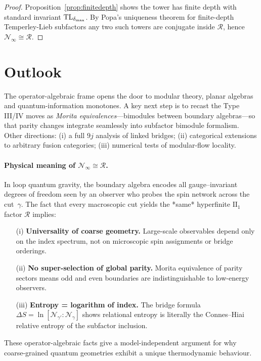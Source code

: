 \documentclass[11pt]{article}
\begin{document}
\begin{proof}
Proposition~\ref{prop:finitedepth} shows the tower has finite depth with
standard invariant ${\rm TL}_{\delta_{\max}}$.
By Popa's uniqueness theorem for finite-depth Temperley-Lieb
subfactors \cite{PopaCBMS} any two such towers are conjugate inside
$\mathcal R$, hence $\mathcal N_{\infty}\cong\mathcal R$.
\end{proof}

\section{Outlook}
The operator-algebraic frame opens the door to modular theory, planar
algebras and quantum-information monotones.  A key next step is to recast the
Type III/IV moves as \emph{Morita equivalences}—bimodules between boundary
algebras—so that parity changes integrate seamlessly into subfactor bimodule
formalism.  Other directions: (i) a full $9j$ analysis of linked bridges; (ii)
categorical extensions to arbitrary fusion categories; (iii) numerical tests of
modular-flow locality.

\paragraph{Physical meaning of $\mathcal N_{\infty}\cong\mathcal R$.}
In loop quantum gravity, the boundary algebra encodes all gauge–invariant
degrees of freedom seen by an observer who probes the spin network across the
cut~$\gamma$.  
The fact that every macroscopic cut yields the *same* hyperfinite
$\mathrm{II}_1$ factor $\mathcal R$ implies:

\begin{enumerate}
\item[(i)] \textbf{Universality of coarse geometry.}  
      Large-scale observables depend only on the index spectrum, not on
      microscopic spin assignments or bridge orderings.
\item[(ii)] \textbf{No super-selection of global parity.}  
      Morita equivalence of parity sectors means odd and even boundaries are
      indistinguishable to low-energy observers.
\item[(iii)] \textbf{Entropy = logarithm of index.}  
      The bridge formula $\Delta S=\ln[\mathcal N_{\gamma'}:\mathcal N_{\gamma}]$
      shows relational entropy is literally the Connes–Hiai relative entropy
      of the subfactor inclusion.
\end{enumerate}
These operator-algebraic facts give a model-independent argument for why
coarse-grained quantum geometries exhibit a unique thermodynamic behaviour.
\end{document}
